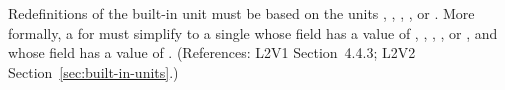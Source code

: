 Redefinitions of the built-in unit  must be based on the
units , , , , or
.  More formally, a \UnitDefinition for
 must simplify to a single \Unit whose  field
has a value of , , , , or
, and whose  field has a value of
.  (References: L2V1 Section~4.4.3; L2V2
Section~\ref{sec:built-in-units}.)
